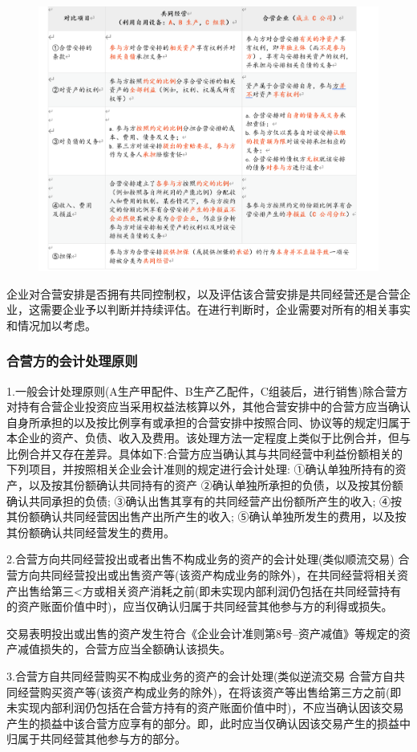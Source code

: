 \documentclass[UTF8,12pt]{ctexart}
\numberwithin{equation}{section} %
\numberwithin{figure}{section}
\numberwithin{table}{section}
\begin{document}
	\begin{figure}
		\centering
		\includegraphics[width=0.7\linewidth]{pic/合营安排}
		\caption{}
		\label{fig:}
	\end{figure}
	
	企业对合营安排是否拥有共同控制权，以及评估该合营安排是共同经营还是合营企业，这需要企业予以判断并持续评估。在进行判断时，企业需要对所有的相关事实和情况加以考虑。
	
	\subsubsection{合营方的会计处理原则}
	1.一般会计处理原则(A生产甲配件、B生产乙配件，C组装后，进行销售)除合营方对持有合营企业投资应当采用权益法核算以外，其他合营安排中的合营方应当确认自身所承担的以及按比例享有或承担的合营安排中按照合同、协议等的规定归属于本企业的资产、负债、收入及费用。该处理方法一定程度上类似于比例合并，但与比例合并又存在差异。具体如下:合营方应当确认其与共同经营中利益份额相关的下列项目，并按照相关企业会计准则的规定进行会计处理:
	①确认单独所持有的资产，以及按其份额确认共同持有的资产
	②确认单独所承担的负债，以及按其份额确认共同承担的负债;
	③确认出售其享有的共同经营产出份额所产生的收入;
	④按其份额确认共同经营因出售产出所产生的收入;
	⑤确认单独所发生的费用，以及按其份额确认共同经营发生的费用。
	
	2.合营方向共同经营投出或者出售不构成业务的资产的会计处理(类似顺流交易)
	合营方向共同经营投出或出售资产等(该资产构成业务的除外)，在共同经营将相关资产出售给第三<方或相关资产消耗之前(即未实现内部利润仍包括在共同经营持有的资产账面价值中时)，应当仅确认归属于共同经营其他参与方的利得或损失。
	
	交易表明投出或出售的资产发生符合《企业会计准则第8号--资产减值》等规定的资产减值损失的，合营方应当全额确认该损失。
	
	3.合营方自共同经营购买不构成业务的资产的会计处理(类似逆流交易
	合营方自共同经营购买资产等(该资产构成业务的除外)，在将该资产等出售给第三方之前(即未实现内部利润仍包括在合营方持有的资产账面价值中时)，不应当确认因该交易产生的损益中该合营方应享有的部分。即，此时应当仅确认因该交易产生的损益中归属于共同经营其他参与方的部分。
	
\end{document}
